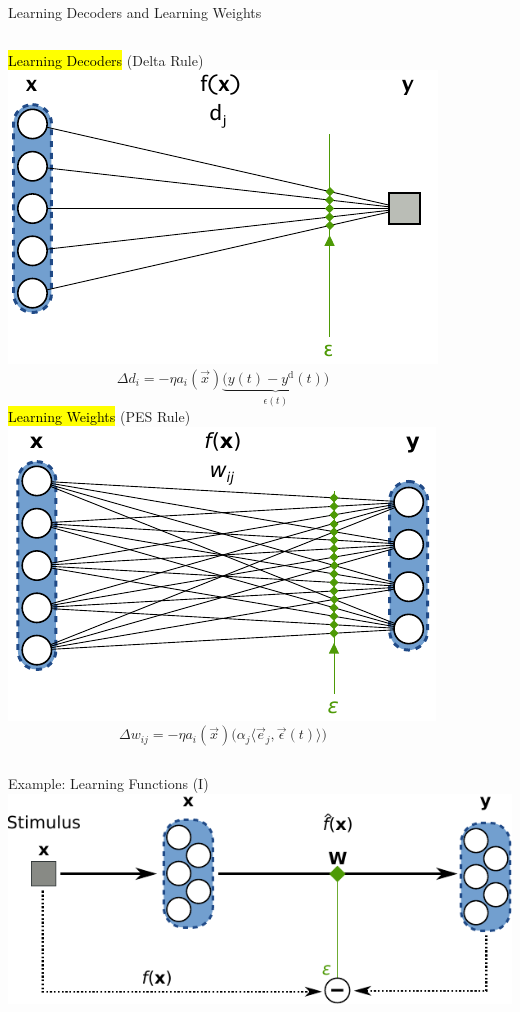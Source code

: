 \documentclass[handout,aspectratio=169]{beamer}
\begin{document}
	\begin{frame}{Learning Decoders and Learning Weights}
		\begin{columns}[T]
			\centering			
			\hl{Learning Decoders} (Delta Rule)\\[0.25cm]
			\includegraphics{media/pes_network_a.pdf}\\[-0.5cm]
			$$\Delta d_i = - \eta a_i(\vec x) \underbrace{\big(y(t) - y^\mathrm{d}(t)\big)}_{\epsilon(t)}$$
			\centering			
			\hl{Learning Weights} (PES Rule)\\[0.25cm]
			\includegraphics{media/pes_network_b.pdf}\\[-0.5cm]
			$$\Delta w_{ij} = - \eta a_i(\vec x) \Big(\alpha_j \langle \vec e_j, \vec \epsilon(t) \rangle \Big)$$
		\end{columns}
	\end{frame}

	\begin{frame}{Example: Learning Functions (I)}
		\centering
		\includegraphics[scale=1.0]{media/learning_network.pdf}
	\end{frame}
\end{document}
